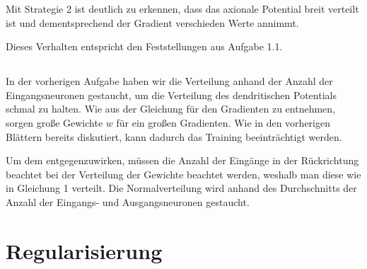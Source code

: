 \documentclass[DIN, pagenumber=false, fontsize=11pt, parskip=half]{scrartcl}
\begin{document}
    Mit Strategie 2 ist deutlich zu erkennen, dass das axionale Potential breit verteilt ist und dementsprechend der Gradient verschieden Werte annimmt.
    
    Dieses Verhalten entspricht den Feststellungen aus Aufgabe 1.1.

    \subsection{}
    In der vorherigen Aufgabe haben wir die Verteilung anhand der Anzahl der Eingangsneuronen gestaucht, um die Verteilung des dendritischen Potentials schmal zu halten. Wie aus der Gleichung für den Gradienten zu entnehmen, sorgen große Gewichte $w$ für ein großen Gradienten. Wie in den vorherigen Blättern bereits diskutiert, kann dadurch das Training beeinträchtigt werden.

    Um dem entgegenzuwirken, müssen die Anzahl der \glqq{}Eingänge\grqq{} in der Rückrichtung beachtet bei der Verteilung der Gewichte beachtet werden, weshalb man diese wie in Gleichung 1 verteilt. 
    Die Normalverteilung wird anhand des Durchschnitts der Anzahl der Eingangs- und Ausgangsneuronen gestaucht.

    \section{Regularisierung}
\end{document}
